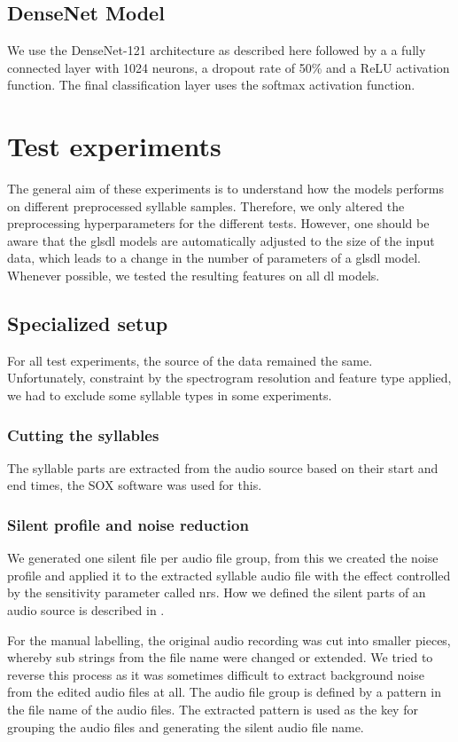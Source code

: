 \subsection{DenseNet Model}
We use the DenseNet-121 architecture as described here \cite{Huang2017a} followed by a a fully connected layer with 1024 neurons, a dropout rate of 50\% and a ReLU activation function. The final classification layer uses the softmax activation function.

\section{Test experiments}
The general aim of these experiments is to understand how the models performs on different preprocessed syllable samples. Therefore, we only altered the preprocessing hyperparameters for the different tests.
However, one should be aware that the gls{dl} models are automatically adjusted to the size of the input data, which leads to a change in the number of parameters of a gls{dl} model.
Whenever possible, we tested the resulting features on all \gls{dl} models.

\subsection{Specialized setup}
For all test experiments, the source of the data remained the same.
Unfortunately, constraint by the spectrogram resolution and feature type applied, we had to exclude some syllable types in some experiments.

\subsubsection{Cutting the syllables}
The syllable parts are extracted from the audio source based on their start and end times, the SOX software was used for this.

\subsubsection{Silent profile and noise reduction}
We generated one silent file per audio file group, from this we created the noise profile and applied it to the extracted syllable audio file with the effect controlled by the sensitivity parameter called \gls{nrs}.
How we defined the silent parts of an audio source is described in . %

For the manual labelling, the original audio recording was cut into smaller pieces, whereby sub strings from the file name were changed or extended.
We tried to reverse this process as it was sometimes difficult to extract background noise from the edited audio files at all.
The audio file group is defined by a pattern in the file name of the audio files. The extracted pattern is used as the key for grouping the audio files and generating the silent audio file name.

